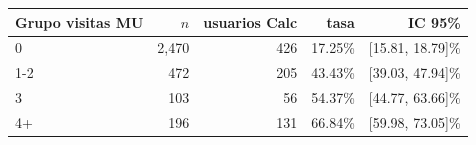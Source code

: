 \begin{tabular}{lrrrr}
\toprule
Grupo visitas MU & $n$ & usuarios Calc & tasa & IC 95\% \\
\midrule
0 & 2,470 & 426 & 17.25\% & [15.81, 18.79]\% \\
1-2 & 472 & 205 & 43.43\% & [39.03, 47.94]\% \\
3 & 103 & 56 & 54.37\% & [44.77, 63.66]\% \\
4+ & 196 & 131 & 66.84\% & [59.98, 73.05]\% \\
\bottomrule
\end{tabular}
